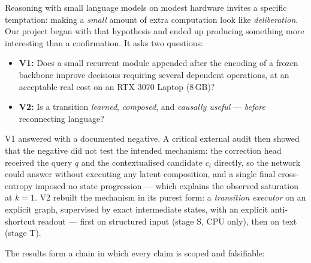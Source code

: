 \documentclass[11pt,a4paper]{article}
\begin{document}
Reasoning with small language models on modest hardware invites a specific temptation: making a \emph{small} amount of extra computation look like \emph{deliberation}. Our project began with that hypothesis and ended up producing something more interesting than a confirmation. It asks two questions:

\begin{itemize}
\item \textbf{V1:} Does a small recurrent module appended after the encoding of a frozen backbone improve decisions requiring several dependent operations, at an acceptable real cost on an RTX 3070 Laptop (8\,GB)?
\item \textbf{V2:} Is a transition \emph{learned}, \emph{composed}, and \emph{causally useful} --- \emph{before} reconnecting language?
\end{itemize}

V1 answered with a documented negative. A critical external audit then showed that the negative did not test the intended mechanism: the correction head received the query $q$ and the contextualised candidate $c_i$ directly, so the network could answer without executing any latent composition, and a single final cross-entropy imposed no state progression --- which explains the observed saturation at $k=1$. V2 rebuilt the mechanism in its purest form: a \emph{transition executor} on an explicit graph, supervised by exact intermediate states, with an explicit anti-shortcut readout --- first on structured input (stage S, CPU only), then on text (stage T).

The results form a chain in which every claim is scoped and falsifiable:
\end{document}
